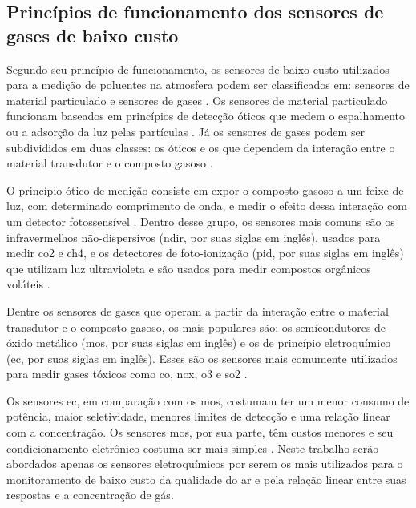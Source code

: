 \subsection{Princípios de funcionamento dos sensores de gases de baixo custo}

Segundo seu princípio de funcionamento, os sensores de baixo custo utilizados para a medição de poluentes na atmosfera podem ser classificados em: sensores de material particulado e sensores de gases \cite{Maag2018ADeployments}. Os sensores de material particulado funcionam baseados em princípios  de detecção óticos que medem o espalhamento ou a adsorção da luz pelas partículas \cite{Rai2017End-userMonitoring}. Já os sensores de gases podem ser subdivididos em duas classes: os óticos e os que dependem da interação entre o material transdutor e o composto gasoso \cite{Snyder2013}.
	
O princípio ótico de medição consiste em expor o composto gasoso a um feixe de luz, com determinado comprimento de onda, e medir o efeito dessa interação com um detector fotossensível \cite{Rai2017End-userMonitoring}. Dentro desse grupo, os sensores mais comuns são os infravermelhos não-dispersivos (\gls{ndir}, por suas siglas em inglês), usados para medir \acrshort{co2} e \acrshort{ch4}, e os detectores de foto-ionização (\gls{pid}, por suas siglas em inglês) que utilizam luz ultravioleta e são usados para medir compostos orgânicos voláteis \cite{Snyder2013}.

Dentre os sensores de gases que operam a partir da interação entre o material transdutor e o composto gasoso, os mais populares são: os semicondutores de óxido metálico (\gls{mos}, por suas siglas em inglês) e os de princípio eletroquímico (\gls{ec}, por suas siglas em inglês). Esses são os sensores mais comumente utilizados para medir gases tóxicos como \acrshort{co}, \acrshort{nox}, \acrshort{o3} e \acrshort{so2} \cite{Lewis2018Low-costApplications}.

Os sensores \gls{ec}, em comparação com os \gls{mos}, costumam ter um menor consumo de potência, maior seletividade, menores limites de detecção e uma relação linear com a concentração. Os sensores \gls{mos}, por sua parte, têm custos menores e seu condicionamento eletrônico costuma ser mais simples \cite{Rai2017End-userMonitoring}. Neste trabalho serão abordados apenas os sensores eletroquímicos por serem os mais utilizados para o monitoramento de baixo custo da qualidade do ar e pela relação linear entre suas respostas e a concentração de gás.

